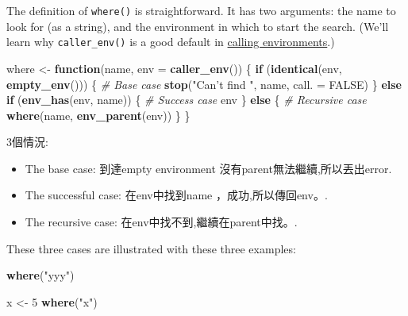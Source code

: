 \documentclass[]{book}
\newenvironment{Shaded}{\begin{snugshade}}{\end{snugshade}}
\newcommand{\CommentTok}[1]{\textcolor[rgb]{0.56,0.35,0.01}{\textit{#1}}}
\newcommand{\ControlFlowTok}[1]{\textcolor[rgb]{0.13,0.29,0.53}{\textbf{#1}}}
\newcommand{\DataTypeTok}[1]{\textcolor[rgb]{0.13,0.29,0.53}{#1}}
\newcommand{\DecValTok}[1]{\textcolor[rgb]{0.00,0.00,0.81}{#1}}
\newcommand{\KeywordTok}[1]{\textcolor[rgb]{0.13,0.29,0.53}{\textbf{#1}}}
\newcommand{\NormalTok}[1]{#1}
\newcommand{\OtherTok}[1]{\textcolor[rgb]{0.56,0.35,0.01}{#1}}
\newcommand{\StringTok}[1]{\textcolor[rgb]{0.31,0.60,0.02}{#1}}
\theoremstyle{definition}
\theoremstyle{definition}
\theoremstyle{definition}
\theoremstyle{remark}
\begin{document}
The definition of \texttt{where()} is straightforward. It has two
arguments: the name to look for (as a string), and the environment in
which to start the search. (We'll learn why \texttt{caller\_env()} is a
good default in \protect\hyperlink{calling-environments}{calling
environments}.)

\begin{Shaded}
\begin{Highlighting}[]
\NormalTok{where <-}\StringTok{ }\ControlFlowTok{function}\NormalTok{(name, }\DataTypeTok{env =} \KeywordTok{caller_env}\NormalTok{()) \{}
  \ControlFlowTok{if}\NormalTok{ (}\KeywordTok{identical}\NormalTok{(env, }\KeywordTok{empty_env}\NormalTok{())) \{}
    \CommentTok{# Base case}
    \KeywordTok{stop}\NormalTok{(}\StringTok{"Can't find "}\NormalTok{, name, }\DataTypeTok{call. =} \OtherTok{FALSE}\NormalTok{)}
\NormalTok{  \} }\ControlFlowTok{else} \ControlFlowTok{if}\NormalTok{ (}\KeywordTok{env_has}\NormalTok{(env, name)) \{}
    \CommentTok{# Success case}
\NormalTok{    env}
\NormalTok{  \} }\ControlFlowTok{else}\NormalTok{ \{}
    \CommentTok{# Recursive case}
    \KeywordTok{where}\NormalTok{(name, }\KeywordTok{env_parent}\NormalTok{(env))}
\NormalTok{  \}}
\NormalTok{\}}
\end{Highlighting}
\end{Shaded}

3個情況:

\begin{itemize}
\item
  The base case: 到達empty environment 沒有parent無法繼續,所以丟出error.
\item
  The successful case: 在env中找到name ，成功,所以傳回env。.
\item
  The recursive case: 在env中找不到,繼續在parent中找。.
\end{itemize}

These three cases are illustrated with these three examples:

\begin{Shaded}
\begin{Highlighting}[]
\KeywordTok{where}\NormalTok{(}\StringTok{"yyy"}\NormalTok{)}
\end{Highlighting}
\end{Shaded}

\begin{Shaded}
\begin{Highlighting}[]
\NormalTok{x <-}\StringTok{ }\DecValTok{5}
\KeywordTok{where}\NormalTok{(}\StringTok{"x"}\NormalTok{)}
\end{Highlighting}
\end{Shaded}
\end{document}
